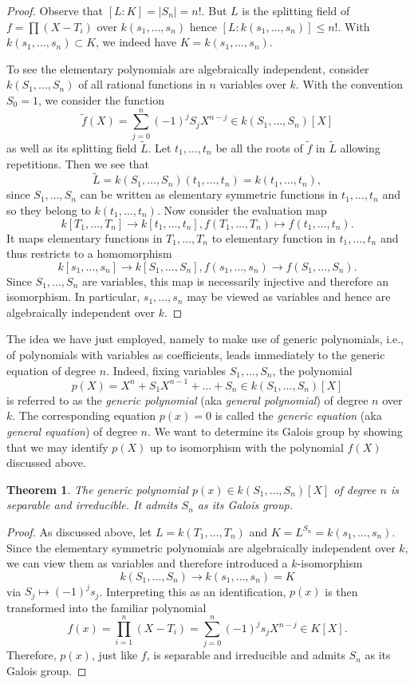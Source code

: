 \documentclass[12pt]{report}
\newtheorem{theorem}{Theorem}[section]
\theoremstyle{definition}
\begin{document}
\begin{proof}
	Observe that $[L:K]=|S_n|=n!$. But $L$ is the splitting field of $f=\prod(X-T_i)$ over $k(s_1,\dots,s_n)$ hence $[L:k(s_1,\dots,s_n)]\leq n!$. With $k(s_1,\dots,s_n)\subset K$, we indeed have $K=k(s_1,\dots,s_n)$.

	To see the elementary polynomials are algebraically independent, consider $k(S_1,\dots,S_n)$ of all rational functions in $n$ variables over $k$. With the convention $S_0=1$, we consider the function $$\tilde{f}(X)=\sum_{j=0}^n(-1)^jS_j X^{n-j}\in k(S_1,\dots,S_n)[X]$$ as well as its splitting field $\tilde{L}$. Let $t_1,\dots,t_n$ be all the roots of $\tilde{f}$ in $\tilde{L}$ allowing repetitions. Then we see that $$\tilde{L}=k(S_1,\dots,S_n)(t_1,\dots,t_n)=k(t_1,\dots,t_n),$$ since $S_1,\dots,S_n$ can be written as elementary symmetric functions in $t_1,\dots,t_n$ and so they belong to $k(t_1,\dots,t_n)$. Now consider the evaluation map
	\[k[T_1,\dots,T_n]\to k[t_1,\dots,t_n], f(T_1,\dots,T_n)\mapsto f(t_1,\dots,t_n).\] It maps elementary functions in $T_1,\dots,T_n$ to elementary function in $t_1,\dots,t_n$ and thus restricts to a homomorphism $$k[s_1,\dots,s_n]\to k[S_1,\dots,S_n], f(s_1,\dots,s_n)\to f(S_1,\dots,S_n).$$ Since $S_1,\dots,S_n$ are variables, this map is necessarily injective and therefore an isomorphism. In particular, $s_1,\dots,s_n$ may be viewed as variables and hence are algebraically independent over $k$.
\end{proof}

The idea we have just employed, namely to make use of generic polynomials, i.e., of polynomials with variables as coefficients, leads immediately to the generic equation of degree $n$. Indeed, fixing variables $S_1, \dots, S_n$, the polynomial
$$p(X) = X^n + S_1X^{n-1} + \dots + S_n \in k(S_1,\dots, S_n)[X]$$
is referred to as the \emph{generic polynomial} (aka \emph{general polynomial}) of degree $n$ over $k$. The corresponding equation $p(x) = 0$ is called the \emph{generic equation} (aka \emph{general equation}) of degree $n$. We want to determine its Galois group by showing that we may identify $p(X)$ up to isomorphism with the polynomial $f(X)$ discussed above.


\begin{theorem}
	The generic polynomial $p(x)\in k(S_1,\dots,S_n)[X]$ of degree $n$ is separable and irreducible. It admits $S_n$ as its Galois group.
\end{theorem}

\begin{proof}
	As discussed above, let $L=k(T_1,\dots,T_n)$ and $K=L^{S_n}=k(s_1,\dots,s_n)$. Since the elementary symmetric polynomials are algebraically independent over $k$, we can view them as variables and therefore introduced a $k$-isomorphism
	$$k(S_1,\dots,S_n)\to k(s_1,\dots,s_n)=K$$ via $S_j\mapsto (-1)^js_j$. Interpreting this as an identification, $p(x)$ is then transformed into the familiar polynomial $$f(x)=\prod_{i=1}^n(X-T_i)=\sum_{j=0}^n(-1)^js_jX^{n-j}\in K[X].$$
	Therefore, $p(x)$, just like $f$, is separable and irreducible and admits $S_n$ as its Galois group.
\end{proof}
\end{document}
